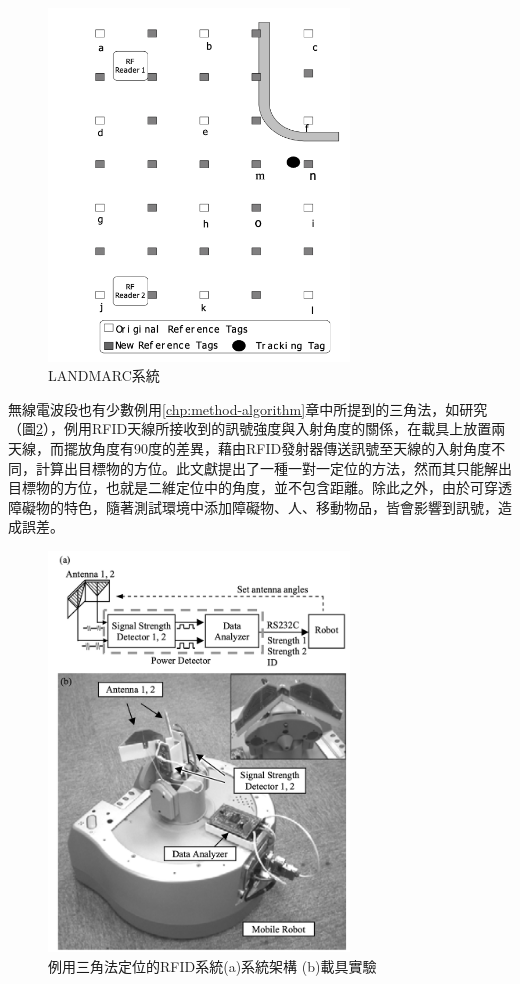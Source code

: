         \begin{figure}[htpb]
            \centering
            \includegraphics[width=8cm]{ch2pic/landmarc.png}
            \caption{LANDMARC系統\cite{landmarc}}
            \label{pic:landmarc}
        \end{figure}

        無線電波段也有少數例用\ref{chp:method-algorithm}章中所提到的三角法，如\cite{case:rfid_1to1}研究（圖\ref{pic:rfid_1to1}），例用RFID天線所接收到的訊號強度與入射角度的關係，在載具上放置兩天線，而擺放角度有90度的差異，藉由RFID發射器傳送訊號至天線的入射角度不同，計算出目標物的方位。此文獻提出了一種一對一定位的方法，然而其只能解出目標物的方位，也就是二維定位中的角度，並不包含距離。除此之外，由於可穿透障礙物的特色，隨著測試環境中添加障礙物、人、移動物品，皆會影響到訊號，造成誤差。

        \begin{figure}[htpb]
            \centering
            \includegraphics[width=8cm]{ch2pic/rfid_1to1.png}
            \caption{例用三角法定位的RFID系統\cite{case:rfid_1to1}(a)系統架構 (b)載具實驗}
            \label{pic:rfid_1to1}
        \end{figure}
        
